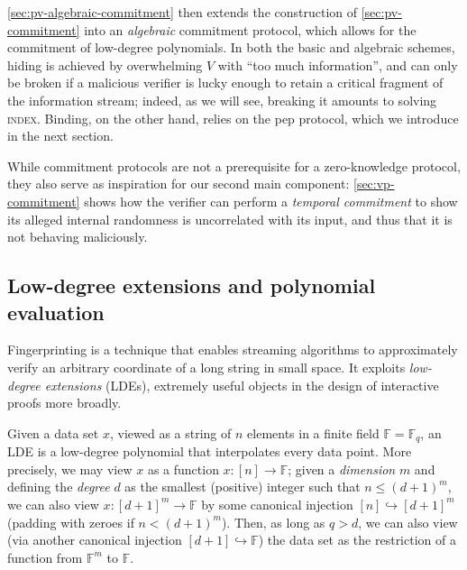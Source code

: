 \documentclass[a4paper,UKenglish,cleveref, autoref, thm-restate]{lipics-v2021}
\theoremstyle{definition}
\newcommand{\field}{\mathbb{F}}
\newcommand{\indexproblem}{\normalfont\textsc{index}\xspace}
\newcommand{\pepprotocol}{\textsf{pep}\xspace}
\newcommand{\dimension}{m}
\newcommand{\degree}{d}
\newcommand{\fieldsize}{q}
\begin{document}
\cref{sec:pv-algebraic-commitment} then extends the construction of \cref{sec:pv-commitment} into an \emph{algebraic} commitment protocol, which allows for the commitment of low-degree polynomials. In both the basic and algebraic schemes, hiding is achieved by overwhelming $V$ with ``too much information'', and can only be broken if a malicious verifier is lucky enough to retain a critical fragment of the information stream; indeed, as we will see, breaking it amounts to solving \indexproblem. Binding, on the other hand, relies on the \pepprotocol protocol, which we introduce in the next section.

While commitment protocols are not a prerequisite for a zero-knowledge protocol, they also serve as inspiration for our second main component: \cref{sec:vp-commitment} shows how the verifier can perform a \emph{temporal commitment} to show its alleged internal randomness is uncorrelated with its input, and thus that it is not behaving maliciously.

\subsection{Low-degree extensions and polynomial evaluation}
\label{sec:lde-pep}

Fingerprinting is a technique that enables streaming algorithms to approximately verify an arbitrary coordinate of a long string in small space. It exploits \emph{low-degree extensions} (LDEs), extremely useful objects in the design of interactive proofs more broadly.

Given a data set $x$, viewed as a string of $n$ elements in a finite field $\field = \field_q$, an LDE is a low-degree polynomial that interpolates every data point. More precisely, we may view $x$ as a function $x: [n] \to \field$; given a \emph{dimension} $\dimension$ and defining the \emph{degree}  $\degree$ as the smallest (positive) integer such that $n \leq (\degree + 1)^\dimension$, we can also view $x: [\degree + 1]^\dimension \to \field$ by some canonical injection $[n] \hookrightarrow [\degree + 1]^\dimension$ (padding with zeroes if $n < (\degree + 1)^\dimension$). Then, as long as $\fieldsize > \degree$, we can also view (via another canonical injection $[\degree + 1] \hookrightarrow \field$) the data set as the restriction of a function from $\field^\dimension$ to $\field$.
\end{document}
